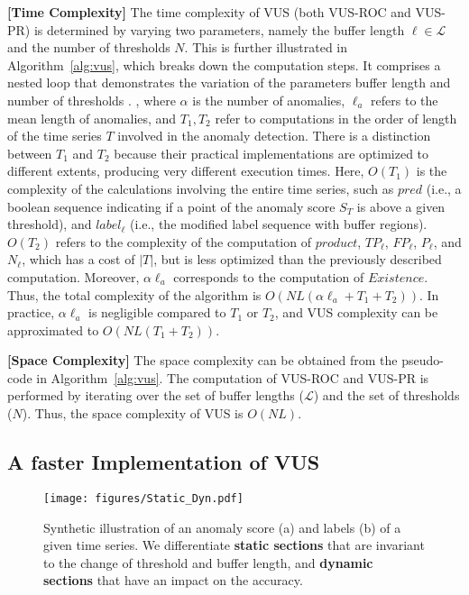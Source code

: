 {\bf [Time Complexity]}
The time complexity of VUS (both VUS-ROC and VUS-PR) is determined by varying two parameters, namely the buffer length $\ell \in \mathcal{L}$ and the number of thresholds $N$.
This is further illustrated in Algorithm~\ref{alg:vus}, which breaks down the computation steps. 
It comprises a nested loop that demonstrates the variation of the parameters buffer length  and number of thresholds . , where $\alpha$ is the number of anomalies, $\ell_a$ refers to the mean length of anomalies, and $T_1, T_2$ refer to computations in the order of length of the time series $T$ involved in the anomaly detection. 
There is a distinction between $T_1$ and $T_2$ because their practical implementations are optimized to different extents, producing very different execution times. 
Here, $O(T_1)$ is the complexity of the calculations involving the entire time series, such as $pred$ (i.e., a boolean sequence indicating if a point of the anomaly score $S_T$ is above a given threshold), and $label_\ell$ (i.e., the modified label sequence with buffer regions). $O(T_2)$ refers to the complexity of the computation of $product$, $TP_\ell$, $FP_\ell$, $P_\ell$, and $N_\ell$, which has a cost of $|T|$, but is less optimized than the previously described computation. 
Moreover, $\alpha \ell_a$ corresponds to the computation of $Existence$. Thus, the total complexity of the algorithm is $O(NL(\alpha \ell_a+T_1+T_2))$. 
In practice, $\alpha \ell_a$ is negligible compared to $T_1$ or $T_2$, and VUS complexity can be approximated to $O(NL(T_1+T_2))$.

{\bf [Space Complexity]}
The space complexity can be obtained from the pseudo-code in Algorithm~\ref{alg:vus}. 
The computation of VUS-ROC and VUS-PR is performed by iterating over the set of buffer lengths ($\mathcal{L}$) and the set of thresholds ($N$). 
Thus, the space complexity of VUS is $O(NL)$.

\subsection{A faster Implementation of VUS}
\label{sec:fasterimpl}

\begin{figure}[tb]
  \centering
  \texttt{[image: figures/Static\_Dyn.pdf]}
  \caption{Synthetic illustration of an anomaly score (a) and labels (b) of a given time series. We differentiate \textbf{static sections} that are invariant to the change of threshold and buffer length, and \textbf{dynamic sections} that have an impact on the accuracy.}
  \label{fig:static_dyn}
\end{figure}

